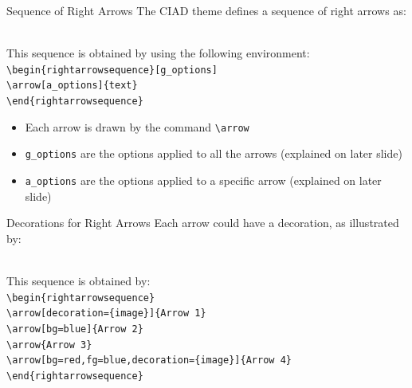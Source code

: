 \documentclass[english,sectioncirclenumberstyle]{ciadbeamer}
\begin{document}
\begin{frame}{Sequence of Right Arrows}
	The CIAD theme defines a sequence of right arrows as:
	\begin{rightarrowsequence}
	\end{rightarrowsequence} \\[.5cm]
	This sequence is obtained by using the following environment: \\
	\texttt{{\textbackslash}begin\{rightarrowsequence\}[g\_options]} \\
	\hspace{.5cm}\texttt{{\textbackslash}arrow[a\_options]\{text\}} \\
	\texttt{{\textbackslash}end\{rightarrowsequence\}}
	
	\begin{itemize}
	\item Each arrow is drawn by the command \texttt{{\textbackslash}arrow}
	\item \texttt{g\_options} are the options applied to all the arrows (explained on later slide)
	\item \texttt{a\_options} are the options applied to a specific arrow (explained on later slide)
	\end{itemize}
\end{frame}

\begin{frame}{Decorations for Right Arrows}
	\smaller
	Each arrow could have a decoration, as illustrated by:
	\begin{rightarrowsequence}
	\end{rightarrowsequence} \\[.5cm]
	This sequence is obtained by: \\
	\texttt{{\textbackslash}begin\{rightarrowsequence\}} \\
	\hspace{.5cm}\texttt{{\textbackslash}arrow[decoration=\{image\}]\{Arrow 1\}} \\
	\hspace{.5cm}\texttt{{\textbackslash}arrow[bg=blue]\{Arrow 2\}} \\
	\hspace{.5cm}\texttt{{\textbackslash}arrow\{Arrow 3\}} \\
	\hspace{.5cm}\texttt{{\textbackslash}arrow[bg=red,fg=blue,decoration=\{image\}]\{Arrow 4\}} \\
	\texttt{{\textbackslash}end\{rightarrowsequence\}}
\end{frame}
\end{document}
